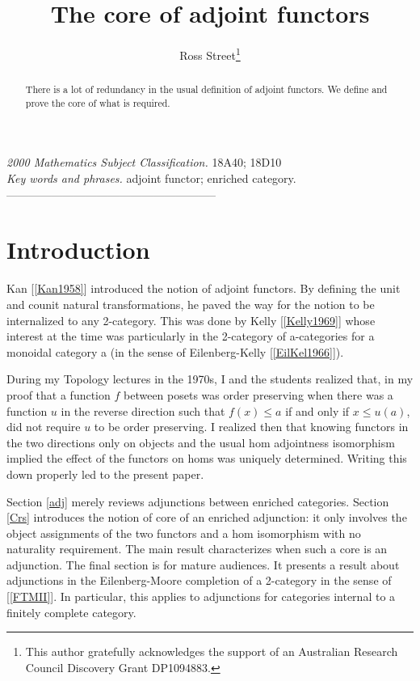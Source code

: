 \documentclass[a4paper,10pt]{article}
\numberwithin{equation}{section}
\begin{document}
\author{Ross Street\footnote{This author gratefully acknowledges the support of an Australian Research Council Discovery Grant DP1094883.}}
\title{The core of adjoint functors}
\date{}
\maketitle
\begin{center}
{\small{\emph{2000 Mathematics Subject Classification.} \quad 18A40; 18D10}}
\\
{\small{\emph{Key words and phrases.} \quad adjoint functor; enriched category.}}
--------------------------------------------------------
\end{center}
\begin{abstract}
\noindent There is a lot of redundancy in the usual definition of adjoint functors. We define and prove the core of what is required.
\end{abstract}
\tableofcontents


\section{Introduction}

Kan [\ref{Kan1958}] introduced the notion of adjoint functors. By defining the unit and counit natural transformations, he paved the way for the notion to be internalized to any 2-category. This was done by Kelly [\ref{Kelly1969}] whose interest at the time was particularly in the 2-category of a-categories for a monoidal category a (in the sense of Eilenberg-Kelly [\ref{EilKel1966}]). 

During my Topology lectures in the 1970s, I and the students realized that, in my proof that a function $f$ between posets was order preserving when there was a function $u$ in the reverse direction such that $f(x) \le a$ if and only if $x \le u(a)$, did not require $u$ to be order preserving. I realized then that knowing functors in the two directions only on objects and the usual hom adjointness isomorphism implied the effect of the functors on homs was uniquely determined. Writing this down properly led to the present paper. 

Section \ref{adj} merely reviews adjunctions between enriched categories. Section \ref{Crs}  introduces the notion of core of an enriched adjunction: it only involves the object assignments of the two functors and a hom isomorphism with no naturality requirement. The main result characterizes when such a core is an adjunction. The final section is for mature audiences. It presents a result about adjunctions in the Eilenberg-Moore completion of a 2-category in the sense of [\ref{FTMII}]. In particular, this applies to adjunctions for categories internal to a finitely complete category.    
\end{document}
